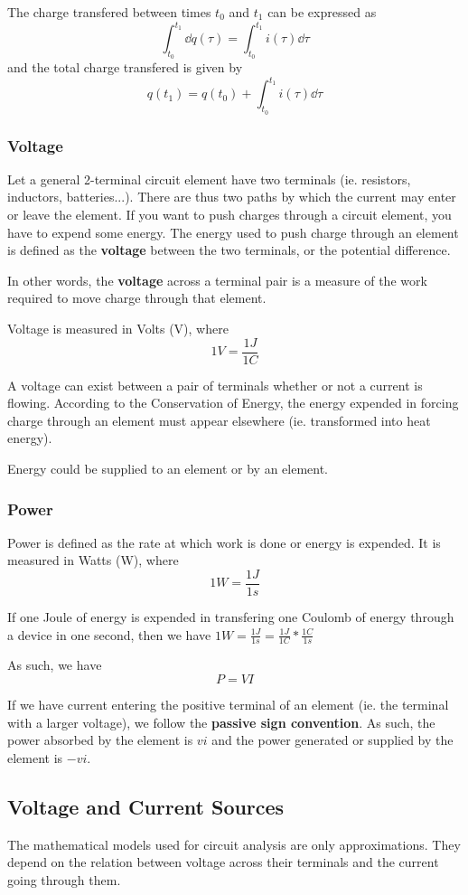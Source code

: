 \documentclass[12pt]{article}
\begin{document}
The charge transfered between times $t_0$ and $t_1$ can be expressed as \[ \int_{t_0}^{t_1} \dd q(\tau) = \int_{t_0}^{t_1} i(\tau) \dd\tau \] and the total charge transfered is given by \[ q(t_1) = q(t_0) + \int_{t_0}^{t_1} i(\tau) \dd\tau \]

\subsubsection*{Voltage}
Let a general 2-terminal circuit element have two terminals (ie. resistors, inductors, batteries...). There are thus two paths by which the current may enter or leave the element. If you want to push charges through a circuit element, you have to expend some energy. The energy used to push charge through an element is defined as the {\bf voltage} between the two terminals, or the potential difference.

In other words, the {\bf voltage} across a terminal pair is a measure of the work required to move charge through that element.

Voltage is measured in Volts (V), where \[ 1V = \frac{1J}{1C} \]

A voltage can exist between a pair of terminals whether or not a current is flowing. According to the Conservation of Energy, the energy expended in forcing charge through an element must appear elsewhere (ie. transformed into heat energy).

Energy could be supplied to an element or by an element.

\subsubsection*{Power}
Power is defined as the rate at which work is done or energy is expended. It is measured in Watts (W), where \[ 1W = \frac{1J}{1s} \]

If one Joule of energy is expended in transfering one Coulomb of energy through a device in one second, then we have $1W = \frac{1J}{1s} = \frac{1J}{1C}*\frac{1C}{1s}$

As such, we have \[ P = VI \]

If we have current entering the positive terminal of an element (ie. the terminal with a larger voltage), we follow the {\bf passive sign convention}. As such, the power absorbed by the element is $vi$ and the power generated or supplied by the element is $-vi$.

\subsection*{Voltage and Current Sources}
The mathematical models used for circuit analysis are only approximations. They depend on the relation between voltage across their terminals and the current going through them.
\end{document}
